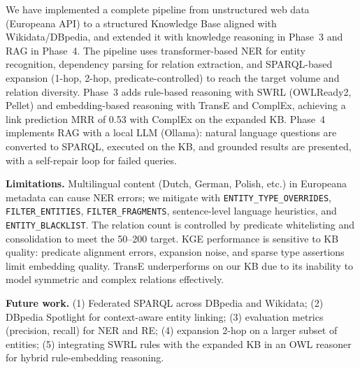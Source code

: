 \documentclass[11pt,a4paper]{article}
\begin{document}
  We have implemented a complete pipeline from unstructured web data (Europeana API) to a structured Knowledge Base aligned with Wikidata/DBpedia, and extended it with knowledge reasoning in Phase~3 and RAG in Phase~4. The pipeline uses transformer-based NER for entity recognition, dependency parsing for relation extraction, and SPARQL-based expansion (1-hop, 2-hop, predicate-controlled) to reach the target volume and relation diversity. Phase~3 adds rule-based reasoning with SWRL (OWLReady2, Pellet) and embedding-based reasoning with TransE and ComplEx, achieving a link prediction MRR of 0.53 with ComplEx on the expanded KB. Phase~4 implements RAG with a local LLM (Ollama): natural language questions are converted to SPARQL, executed on the KB, and grounded results are presented, with a self-repair loop for failed queries.

  \textbf{Limitations.} Multilingual content (Dutch, German, Polish, etc.) in Europeana metadata can cause NER errors; we mitigate with \texttt{ENTITY\_TYPE\_OVERRIDES}, \texttt{FILTER\_ENTITIES}, \texttt{FILTER\_FRAGMENTS}, sentence-level language heuristics, and \texttt{ENTITY\_BLACKLIST}. The relation count is controlled by predicate whitelisting and consolidation to meet the 50--200 target. KGE performance is sensitive to KB quality: predicate alignment errors, expansion noise, and sparse type assertions limit embedding quality. TransE underperforms on our KB due to its inability to model symmetric and complex relations effectively.

  \textbf{Future work.} (1) Federated SPARQL across DBpedia and Wikidata; (2) DBpedia Spotlight for context-aware entity linking; (3) evaluation metrics (precision, recall) for NER and RE; (4) expansion 2-hop on a larger subset of entities; (5) integrating SWRL rules with the expanded KB in an OWL reasoner for hybrid rule-embedding reasoning.

  
\end{document}
